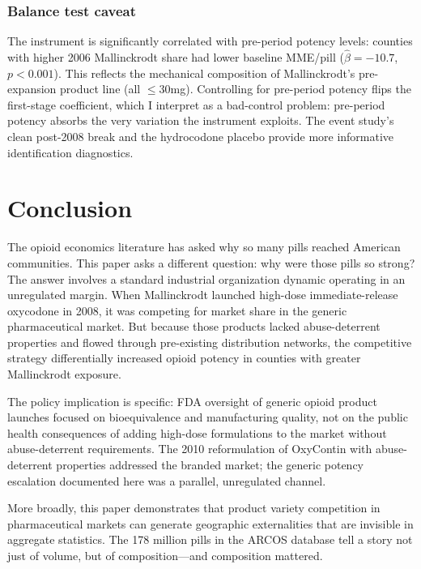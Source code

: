 \documentclass[12pt]{article}
\begin{document}
\subsubsection*{Balance test caveat} The instrument is significantly correlated with pre-period potency levels: counties with higher 2006 Mallinckrodt share had lower baseline MME/pill ($\hat{\beta} = -10.7$, $p < 0.001$). This reflects the mechanical composition of Mallinckrodt's pre-expansion product line (all $\leq$30mg). Controlling for pre-period potency flips the first-stage coefficient, which I interpret as a bad-control problem: pre-period potency absorbs the very variation the instrument exploits. The event study's clean post-2008 break and the hydrocodone placebo provide more informative identification diagnostics.


\section{Conclusion}
\label{sec:conclusion}

The opioid economics literature has asked why so many pills reached American communities. This paper asks a different question: why were those pills so strong? The answer involves a standard industrial organization dynamic operating in an unregulated margin. When Mallinckrodt launched high-dose immediate-release oxycodone in 2008, it was competing for market share in the generic pharmaceutical market. But because those products lacked abuse-deterrent properties and flowed through pre-existing distribution networks, the competitive strategy differentially increased opioid potency in counties with greater Mallinckrodt exposure.

The policy implication is specific: FDA oversight of generic opioid product launches focused on bioequivalence and manufacturing quality, not on the public health consequences of adding high-dose formulations to the market without abuse-deterrent requirements. The 2010 reformulation of OxyContin with abuse-deterrent properties addressed the branded market; the generic potency escalation documented here was a parallel, unregulated channel.

More broadly, this paper demonstrates that product variety competition in pharmaceutical markets can generate geographic externalities that are invisible in aggregate statistics. The 178 million pills in the ARCOS database tell a story not just of volume, but of composition---and composition mattered.

\label{apep_main_text_end}
\end{document}
